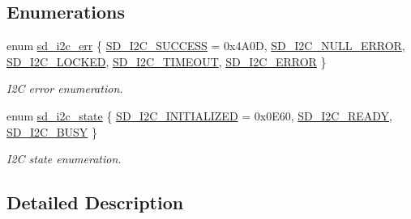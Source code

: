 \subsection*{Enumerations}
\begin{DoxyCompactItemize}
\item 
enum \mbox{\hyperlink{group___s_d___i2_c___types_gae1e3131e61bdef08371262ffb4948a04}{sd\+\_\+i2c\+\_\+err}} \{ \newline
\mbox{\hyperlink{group___s_d___i2_c___types_ggae1e3131e61bdef08371262ffb4948a04a8ac753d592892daa8d2f9109c59b884b}{S\+D\+\_\+\+I2\+C\+\_\+\+S\+U\+C\+C\+E\+SS}} = 0x4\+A0D, 
\mbox{\hyperlink{group___s_d___i2_c___types_ggae1e3131e61bdef08371262ffb4948a04a6c451bc21bb316eb9e3637e85feb7877}{S\+D\+\_\+\+I2\+C\+\_\+\+N\+U\+L\+L\+\_\+\+E\+R\+R\+OR}}, 
\mbox{\hyperlink{group___s_d___i2_c___types_ggae1e3131e61bdef08371262ffb4948a04a168b78f5646e80bd09f2f069f1c7b469}{S\+D\+\_\+\+I2\+C\+\_\+\+L\+O\+C\+K\+ED}}, 
\mbox{\hyperlink{group___s_d___i2_c___types_ggae1e3131e61bdef08371262ffb4948a04a7962894824c2c2ceeccb36d60b884087}{S\+D\+\_\+\+I2\+C\+\_\+\+T\+I\+M\+E\+O\+UT}}, 
\newline
\mbox{\hyperlink{group___s_d___i2_c___types_ggae1e3131e61bdef08371262ffb4948a04a8c2d0ed2a4601d3eede97f9c09510bcf}{S\+D\+\_\+\+I2\+C\+\_\+\+E\+R\+R\+OR}}
 \}
\begin{DoxyCompactList}\small\item\em I2C error enumeration. \end{DoxyCompactList}\item 
enum \mbox{\hyperlink{group___s_d___i2_c___types_gaf9254fee305a19fcc68f616121146552}{sd\+\_\+i2c\+\_\+state}} \{ \mbox{\hyperlink{group___s_d___i2_c___types_ggaf9254fee305a19fcc68f616121146552a1ef137e3af800d0329a59f9abfc57732}{S\+D\+\_\+\+I2\+C\+\_\+\+I\+N\+I\+T\+I\+A\+L\+I\+Z\+ED}} = 0x0\+E60, 
\mbox{\hyperlink{group___s_d___i2_c___types_ggaf9254fee305a19fcc68f616121146552a521415eae27441855ada6fa17d0f32fe}{S\+D\+\_\+\+I2\+C\+\_\+\+R\+E\+A\+DY}}, 
\mbox{\hyperlink{group___s_d___i2_c___types_ggaf9254fee305a19fcc68f616121146552a0a98c659a559bc681590e7b00bf8a9bc}{S\+D\+\_\+\+I2\+C\+\_\+\+B\+U\+SY}}
 \}
\begin{DoxyCompactList}\small\item\em I2C state enumeration. \end{DoxyCompactList}\end{DoxyCompactItemize}


\subsection{Detailed Description}


